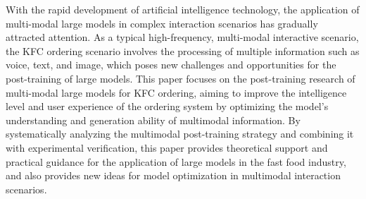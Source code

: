 With the rapid development of artificial intelligence technology, the application of multi-modal large 
models in complex interaction scenarios has gradually attracted attention. As a typical high-frequency, 
multi-modal interactive scenario, the KFC ordering scenario involves the processing of multiple 
information such as voice, text, and image, which poses new challenges and opportunities for the 
post-training of large models. This paper focuses on the post-training research of multi-modal large 
models for KFC ordering, aiming to improve the intelligence level and user experience of the ordering 
system by optimizing the model's understanding and generation ability of multimodal information. By 
systematically analyzing the multimodal post-training strategy and combining it with experimental 
verification, this paper provides theoretical support and practical guidance for the application of 
large models in the fast food industry, and also provides new ideas for model optimization in multimodal 
interaction scenarios.